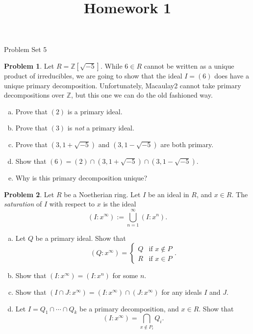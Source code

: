\documentclass[11pt]{article}
\title{}
\date{\vspace{-0.5in}}
\title{Homework 1}
\theoremstyle{definition}
\newtheorem{problem}{Problem}
\begin{document}
\thispagestyle{fancy}
\pagestyle{fancy}


\begin{center}
	{\LARGE Problem Set 5}
\end{center}


\begin{problem}
	Let $R = \mathbb{Z}[\sqrt{-5}]$. While $6 \in R$ cannot be written as a unique product of irreducibles, we are going to show that the ideal $I = (6)$ does have a unique primary decomposition. Unfortunately, Macaulay2 cannot take primary decompositions over $\mathbb{Z}$, but this one we can do the old fashioned way.	
	\begin{enumerate}[a)]
	\item Prove that $(2)$ is a primary ideal.
	\item Prove that $(3)$ is \emph{not} a primary ideal.
	\item Prove that $(3, 1+\sqrt{-5})$ and $(3, 1-\sqrt{-5})$ are both primary.
	\item Show that $(6) = (2) \cap (3, 1+\sqrt{-5}) \cap (3, 1 -\sqrt{-5})$.
	\item Why is this primary decomposition unique?
	\end{enumerate}
\end{problem}


\begin{problem} Let $R$ be a Noetherian ring. Let $I$ be an ideal in $R$, and $x \in R$. The \emph{saturation} of $I$ with respect to $x$ is the ideal
$$(I : x^\infty) := \bigcup_{n=1}^\infty (I : x^n).$$
	\begin{enumerate}[a)]
	\item Let $Q$ be a primary ideal. Show that
	$$(Q : x^\infty) = \left\lbrace \begin{array}{ll} Q & \textrm{if } x \notin P \\ R & \textrm{if } x \in P \end{array}\right. .$$
	\item Show that $(I : x^\infty) = (I : x^n)$ for some $n$.
	\item Show that $(I \cap J : x^\infty) = (I : x^\infty) \cap (J : x^\infty)$ for any ideals $I$ and $J$.
	\item Let $I = Q_1 \cap \cdots \cap Q_k$ be a primary decomposition, and $x \in R$. Show that
	$$(I : x^\infty) = \bigcap_{x \notin P_i} Q_i.$$
	\end{enumerate}
\end{problem}
\end{document}
